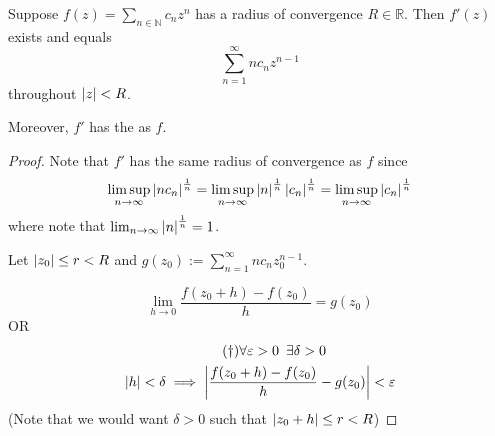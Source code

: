 \documentclass[11pt, oneside]{book}
\begin{document}
\begin{thm}\label{thm:power_function_holomorphic_function_region_of_convergence}
	Suppose $f(z) = \sum_{n\in \mathbb{N}} c_n z^n$ has a radius of convergence $R \in \mathbb{R}$. Then $f'(z)$ exists and equals
	\begin{equation*}
		\sum_{n=1}^{\infty} nc_nz^{n - 1}
	\end{equation*}
	throughout $\left|z\right| < R$.

	Moreover, $f'$ has the  as $f$.
\end{thm}

\begin{proof}
	Note that $f'$ has the same radius of convergence as $f$ since
	\begin{equation*}
		\limsup_{n \to \infty} \left|nc_n\right|^\frac{1}{n} = \limsup_{n \to \infty} \left|n\right|^\frac{1}{n} \left|c_n\right|^\frac{1}{n} = \limsup_{n \to \infty} \left|c_n\right|^\frac{1}{n}
	\end{equation*}
	where note that $\lim_{n \to \infty} \left|n\right|^\frac{1}{n} = 1$.

	Let $\left|z_0\right| \leq r < R$ and $g(z_0) := \sum_{n=1}^{\infty} nc_n z_0^{n - 1} $.

	\WTS
	\begin{equation*}
		\lim_{h \to 0} \frac{f(z_0 + h) - f(z_0)}{h} = g(z_0)
	\end{equation*}
	OR
	\begin{gather*}\label{eq:power_function_defines_holomorphic_function_epsilondelta}\tag{$\dagger$}
		\forall \varepsilon > 0 \enspace \exists \delta > 0 \\
		\left|h\right| < \delta \implies \left|\frac{f(z_0 + h) - f(z_0)}{h} -g(z_0)\right| < \varepsilon
	\end{gather*}
	(Note that we would want $\delta > 0$ such that $\left|z_0 + h\right| \leq r < R$)


\end{proof}
\end{document}

